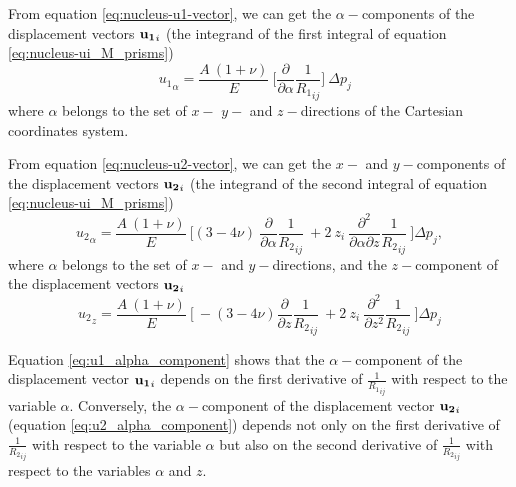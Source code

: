 \documentclass[journal abbreviation, manuscript]{copernicus}
\begin{document}
From equation \ref{eq:nucleus-u1-vector},  we can get the   
$\alpha-$components of the displacement vectors ${\bf{u_{1}}}_{i}$  (the integrand of the first integral of equation \ref{eq:nucleus-ui_M_prisms})
\begin{equation}
{u_{1}}_\alpha =  \frac{A  \: (1 + \nu)}{E} \: \Bigg[  \frac{\partial }{\partial \alpha} {\frac{1}{{R_1}_{ij}}} \Bigg] \: \Delta p_{j} \:\:\:  
\label{eq:u1_alpha_component}
\end{equation}
where $\alpha$  belongs to the set of $ x-$ $y-$ and $z-$directions of the Cartesian coordinates system.

From equation  \ref{eq:nucleus-u2-vector}, we can get the $ x-$ and $y-$components of the displacement vectors ${\bf{u_{2}}}_{i}$  (the integrand of the second integral of equation \ref{eq:nucleus-ui_M_prisms})
\begin{equation}
{u_{2}}_\alpha =  \frac{A  \: (1 + \nu)}{E} \: \Bigg[ 
(3  - 4 \nu)    \: \frac{\partial }{\partial \alpha} {\frac{1}{{R_2}_{ij}}}\: 
+ 2 \: z_{i} \:  
\frac{\partial^{2}  }{\partial \alpha \partial z} {\frac{1}{{R_2}_{ij}}}  \: \Bigg]
\Delta p_{j} ,
\label{eq:u2_alpha_component}
\end{equation}
where  $\alpha$  belongs to the set of $ x-$ and $y-$directions, and the $z-$component of the displacement vectors ${\bf{u_{2}}}_{i}$  
\begin{equation}
{u_{2}}_z =  \frac{A  \: (1 + \nu)}{E} \: \Bigg[ 
\: - (3  - 4 \nu)  \frac{\partial }{\partial z} {\frac{1}{{R_2}_{ij}}}\: 
+ 2 \: z_{i} \:  
\frac{\partial^{2}  }{\partial z^{2}} {\frac{1}{{R_2}_{ij}}}  \: \Bigg]
\Delta p_{j}
\label{eq:u2_z_component}
\end{equation}


Equation \ref{eq:u1_alpha_component} shows that the $\alpha-$component of the displacement vector ${\bf{u_{1}}}_{i}$  depends on the first derivative of ${\frac{1}{{R_1}_{ij}}}$  
with respect to the variable $\alpha$.
Conversely, the $\alpha-$component of the displacement vector ${\bf{u_{2}}}_{i}$  
(equation \ref{eq:u2_alpha_component}) depends not only on the first derivative of 
${\frac{1}{{R_2}_{ij}}}$  with respect to the variable $\alpha$ but also on the second derivative of ${\frac{1}{{R_2}_{ij}}}$  with respect to the variables $\alpha$ and $z$.
\end{document}
